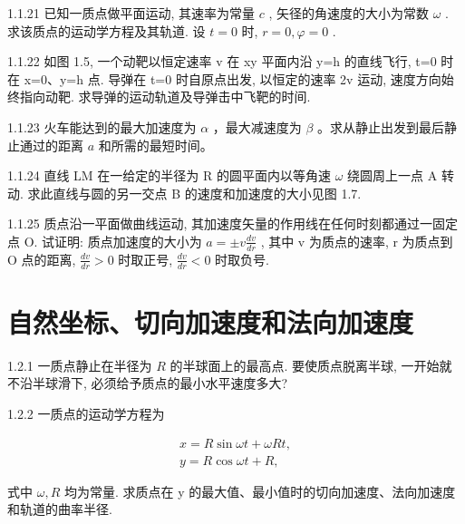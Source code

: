 \begin{problem}{1.1.21}
已知一质点做平面运动, 其速率为常量 $c$ , 矢径的角速度的大小为常数 $\omega$ . 求该质点的运动学方程及其轨道. 设 $t=0$ 时, $r=0, \varphi=0$ .
\end{problem}
\clearpage


\begin{problem}{1.1.22}
如图 1.5, 一个动靶以恒定速率 v 在 xy 平面内沿 y=h 的直线飞行, t=0 时在 x=0、y=h 点. 导弹在 t=0 时自原点出发, 以恒定的速率 2v 运动, 速度方向始终指向动靶. 求导弹的运动轨道及导弹击中飞靶的时间.
\begin{center}

\end{center}
\end{problem}
\clearpage


\begin{problem}{1.1.23}
火车能达到的最大加速度为 $\alpha$ ，最大减速度为 $\beta$ 。求从静止出发到最后静止通过的距离 $a$ 和所需的最短时间。
\end{problem}
\clearpage


\begin{problem}{1.1.24}
直线 LM 在一给定的半径为 R 的圆平面内以等角速 $\omega$ 绕圆周上一点 A 转动. 求此直线与圆的另一交点 B 的速度和加速度的大小见图 1.7.
\begin{center}

\end{center}
\end{problem}
\clearpage


\begin{problem}{1.1.25}
质点沿一平面做曲线运动, 其加速度矢量的作用线在任何时刻都通过一固定点 O. 试证明: 质点加速度的大小为 $a = \pm v \frac{dv}{dr}$ , 其中 v 为质点的速率, r 为质点到 O 点的距离, $\frac{dv}{dr} > 0$ 时取正号, $\frac{dv}{dr} < 0$ 时取负号.
\end{problem}
\clearpage


\section{自然坐标、切向加速度和法向加速度}

\begin{problem}{1.2.1}
一质点静止在半径为 $R$ 的半球面上的最高点. 要使质点脱离半球, 一开始就不沿半球滑下, 必须给予质点的最小水平速度多大?
\end{problem}
\clearpage


\begin{problem}{1.2.2}
一质点的运动学方程为

\[
\begin{array}{l} x = R \sin \omega t + \omega R t, \\ y = R \cos \omega t + R, \end{array}
\]

式中 $\omega, R$ 均为常量. 求质点在 y 的最大值、最小值时的切向加速度、法向加速度和轨道的曲率半径.
\end{problem}
\clearpage


